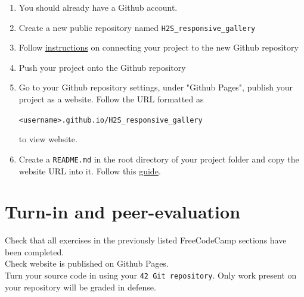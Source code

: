 \documentclass{42-en}
\begin{document}
\begin{enumerate}
    \item You should already have a Github account.
    \item Create a new public repository named \texttt{H2S\_responsive\_gallery}
    \item Follow \href{https://help.github.com/en/articles/adding-a-remote}{instructions} on connecting your project to the new Github repository
    \item Push your project onto the Github repository
    \item Go to your Github repository settings, under "Github Pages", publish your project as a website. Follow the URL formatted as
    \begin{center}
        \texttt{<username>.github.io/H2S\_responsive\_gallery} \\
    \end{center}
    to view website.
    \item Create a \texttt{README.md} in the root directory of your project folder and copy the website URL into it. Follow this \href{https://help.github.com/en/articles/basic-writing-and-formatting-syntax#headings}{guide}.
\end{enumerate}

\chapter{Turn-in and peer-evaluation}

    Check that all exercises in the previously listed FreeCodeCamp sections have been completed.\\
    
    Check website is published on Github Pages.\\

    Turn your source code in using your \texttt{42 Git repository}. Only work present on your repository will be graded in defense.

\end{document}
